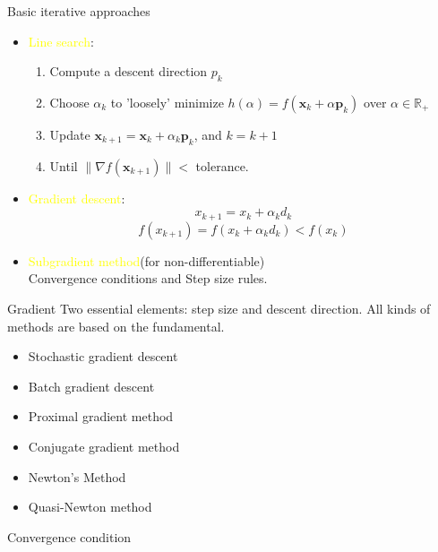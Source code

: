     \begin{frame}{Basic iterative approaches}
      \begin{itemize}
        \item \textcolor{yellow}{Line search}:
        \begin{enumerate}
          \item Compute a descent direction $p_k$
          \item Choose $ \displaystyle \alpha _{k} $ to 'loosely' minimize $ h(\alpha )=f(\mathbf {x} _{k}+\alpha \mathbf {p} _{k}) $ over $ \alpha \in \mathbb {R} _{+}$
          \item Update $ \mathbf {x} _{k+1}=\mathbf {x} _{k}+\alpha _{k}\mathbf {p} _{k} $, and $ {\textstyle k=k+1} $
          \item Until $ \|\nabla f(\mathbf {x} _{k+1})\| <$ tolerance.
        \end{enumerate}

        \item \textcolor{yellow}{Gradient descent}:
        \[x_{k+1}=x_k+\alpha_k d_k\]
        \[f(x_{k+1}) = f(x_k+\alpha_k d_k) < f(x_k)\]
        \item \textcolor{yellow}{Subgradient method}(for non-differentiable)
        \\
        Convergence conditions and Step size rules.
      \end{itemize}
    \end{frame}

    \begin{frame}{Gradient}
      Two essential elements: step size and descent direction. All kinds of methods are based on the fundamental.
      \begin{itemize}
        \item Stochastic gradient descent
        \item Batch gradient descent
        \item Proximal gradient method
        \item Conjugate gradient method
        \item Newton's Method
        \item Quasi-Newton method
      \end{itemize}
      Convergence condition
    \end{frame}

